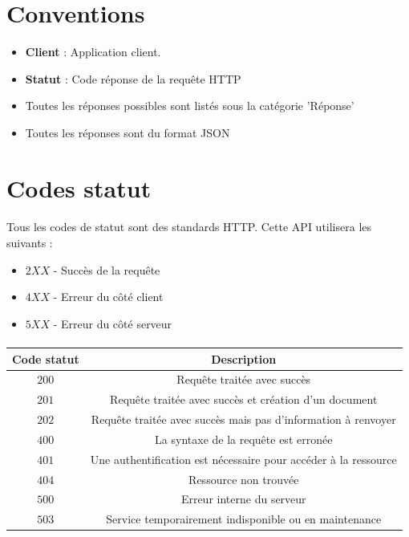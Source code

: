 \documentclass[titlepage, 12pt]{report}
\begin{document}
\section{Conventions}
\begin{itemize}
	\item \textbf{Client} : Application client.
	\item \textbf{Statut} : Code réponse de la requête HTTP
	\item Toutes les réponses possibles sont listés sous la catégorie 'Réponse'
	\item Toutes les réponses sont du format JSON
\end{itemize}


\section{Codes statut}

\paragraph{} Tous les codes de statut sont des standards HTTP. Cette API utilisera les suivants : 
\begin{itemize}
	\item $ 2XX $ - Succès de la requête
	\item $ 4XX $ - Erreur du côté client
	\item $ 5XX $ - Erreur du côté serveur		
\end{itemize}

\paragraph{}

\begin{center}
	\begin{tabular}{|c|c|}
		\hline
		Code statut & Description \\
		\hline \hline
		$ 200 $ & Requête traitée avec succès \\
		\hline 
		$ 201 $ & Requête traitée avec succès et création d'un document \\	
		\hline 
		$ 202 $ & Requête traitée avec succès mais pas d'information à renvoyer \\
		\hline \hline 
		$ 400 $ & La syntaxe de la requête est erronée \\	
		\hline 
		$ 401 $ & Une authentification est nécessaire pour accéder à la ressource \\	
		\hline
		$ 404 $ & Ressource non trouvée \\
		\hline \hline
		$ 500 $ & Erreur interne du serveur \\
		\hline
		$ 503 $ & Service temporairement indisponible ou en maintenance \\ 	
		\hline
	\end{tabular}
\end{center}
\end{document}
